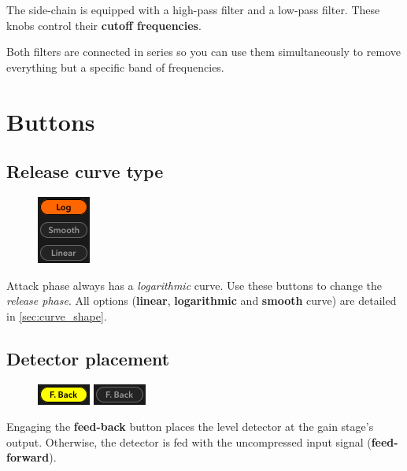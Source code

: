The side-chain is equipped with a high-pass filter and a low-pass
filter.  These knobs control their \textbf{cutoff frequencies}.

Both filters are connected in series so you can use them
simultaneously to remove everything but a specific band of
frequencies.

\chapter{Buttons}
\label{sec:buttons}

\section{Release curve type}

\begin{figure}
  \includegraphics[scale=\screenshotscale,clip]{include/images/buttons_release_curve.png}
\end{figure}

Attack phase always has a \emph{logarithmic} curve.  Use these buttons
to change the \emph{release phase}.  All options (\textbf{linear},
\textbf{logarithmic} and \textbf{smooth} curve) are detailed in
\ref{sec:curve_shape}.

\section{Detector placement}

\begin{figure}
  \includegraphics[scale=\screenshotscale,clip]{include/images/button_feedback_on.png}
  \newline \vspace{-0.9\baselineskip}
  \includegraphics[scale=\screenshotscale,clip]{include/images/button_feedback_off.png}
\end{figure}

Engaging the \textbf{feed-back} button places the level detector at
the gain stage's output.  Otherwise, the detector is fed with the
uncompressed input signal (\textbf{feed-forward}).

